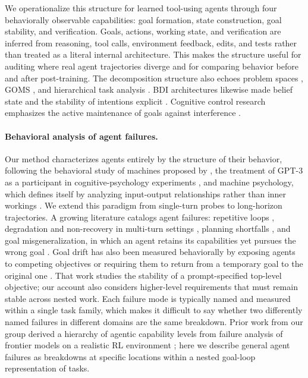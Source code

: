 \documentclass{article}
\begin{document}
We operationalize this structure for learned tool-using agents through four behaviorally observable capabilities: goal formation, state construction, goal stability, and verification. Goals, actions, working state, and verification are inferred from reasoning, tool calls, environment feedback, edits, and tests rather than treated as a literal internal architecture. This makes the structure useful for auditing where real agent trajectories diverge and for comparing behavior before and after post-training. The decomposition structure also echoes problem spaces \citep{newell1972human}, GOMS \citep{card1983psychology}, and hierarchical task analysis \citep{annett1967task}. BDI architectures likewise made belief state and the stability of intentions explicit \citep{bratman1987intention, rao1995bdi}. Cognitive control research emphasizes the active maintenance of goals against interference \citep{miller2001integrative, duncan2012goalneglect}.

\paragraph{Behavioral analysis of agent failures.}
Our method characterizes agents entirely by the structure of their behavior, following the behavioral study of machines proposed by \citet{rahwan2019machine}, the treatment of GPT-3 as a participant in cognitive-psychology experiments \citep{binz2023cogpsych}, and machine psychology, which defines itself by analyzing input-output relationships rather than inner workings \citep{hagendorff2024machine}. We extend this paradigm from single-turn probes to long-horizon trajectories. A growing literature catalogs agent failures: repetitive loops \citep{yao2023react}, degradation and non-recovery in multi-turn settings \citep{laban2025lost}, planning shortfalls \citep{valmeekam2023planbench, kambhampati2024llmmodulo}, and goal misgeneralization, in which an agent retains its capabilities yet pursues the wrong goal \citep{langosco2022goal, shah2022goal}. Goal drift has also been measured behaviorally by exposing agents to competing objectives or requiring them to return from a temporary goal to the original one \citep{arike2025goaldrift}. That work studies the stability of a prompt-specified top-level objective; our account also considers higher-level requirements that must remain stable across nested work. Each failure mode is typically named and measured within a single task family, which makes it difficult to say whether two differently named failures in different domains are the same breakdown. Prior work from our group derived a hierarchy of agentic capability levels from failure analysis of frontier models on a realistic RL environment \citep{ritchie2026hierarchy}; here we describe general agent failures as breakdowns at specific locations within a nested goal-loop representation of tasks.
\end{document}
